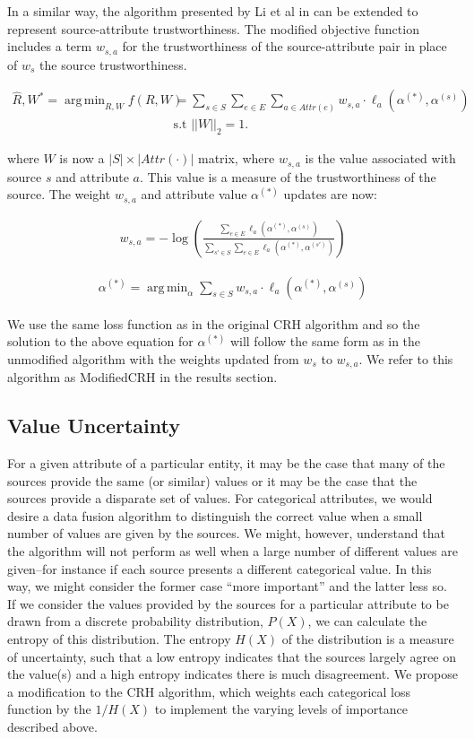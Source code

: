 \documentclass{acm_proc_article-sp}
\DeclareMathOperator*{\argmin}{arg\,min}
\begin{document}
In a similar way, the algorithm presented by Li et al in \cite{li:resolving} can be extended to represent source-attribute trustworthiness. The modified objective function includes a term $w_{s,a}$ for the trustworthiness of the source-attribute pair in place of $w_s$ the source trustworthiness. 

\begin{align}
\hat{R}, W^* = \argmin_{R,W} f(R, W) & = \sum_{s \in S} \sum_{e \in E} \sum_{a \in Attr(e)} w_{s,a} \cdot \ell_a(\alpha^{(*)}, \alpha^{(s)}) \\
& \text{s.t } ||W||_2 =1. \nonumber 
\end{align}

where  $W$ is now a $|S|\times |Attr(\cdot)|$ matrix, where $w_{s,a}$ is the value associated with source $s$ and attribute $a$. This value is a measure of the trustworthiness of the source. The weight $w_{s,a}$ and attribute value $\alpha^{(*)}$ updates are now: 


\begin{align}
w_{s,a} = - \log \left ( \frac{\sum_{e \in E} \ell_a(\alpha^{(*)}, \alpha^{(s)})}{\sum_{s' \in S} \sum_{e \in E}  \ell_a(\alpha^{(*)}, \alpha^{(s')})} \right )
\end{align}

\begin{align}
\alpha^{(*)} = \argmin_\alpha \sum_{s \in S} w_{s,a} \cdot \ell_a(\alpha^{(*)}, \alpha^{(s)})
\end{align}

We use the same loss function as in the original CRH algorithm and so the solution to the above equation for $\alpha^{(*)}$ will follow the same form as in the unmodified algorithm with the weights updated from $w_s$ to $w_{s,a}$. We refer to this algorithm as {\sc ModifiedCRH} in the results section. 

\subsection{Value Uncertainty}

For a given attribute of a particular entity, it may be the case that many of the sources provide the same (or similar) values or it may be the case that the sources provide a disparate set of values. For categorical attributes, we would desire a data fusion algorithm to distinguish the correct value when a small number of values are given by the sources. We might, however, understand that the algorithm will not perform as well when a large number of different values are given--for instance if each source presents a different categorical value. In this way, we might consider the former case ``more important'' and the latter less so. If we consider the values provided by the sources for a particular attribute to be drawn from a discrete probability distribution, $P(X)$, we can calculate the entropy of this distribution. The entropy $H(X)$ of the distribution is a measure of uncertainty, such that a low entropy indicates that the sources largely agree on the value(s) and a high entropy indicates there is much disagreement. We propose a modification to the CRH algorithm, which weights each categorical loss function by the $1 / H(X)$ to implement the varying levels of importance described above. 
\end{document}
